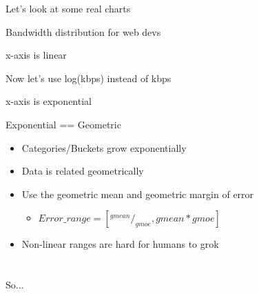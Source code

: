 \documentclass{beamer}
\begin{document}
\begin{frame}{}
\begin{block}{}
\begin{center}
Let's look at some real charts
\end{center}
\end{block}
\end{frame}

\begin{frame}{Bandwidth distribution for web devs}
  \parbox[c][0.55\paperheight]{\paperwidth}{ }
  \begin{center} x-axis is linear \end{center}
\end{frame}

\begin{frame}{Now let's use log(kbps) instead of kbps}
  \parbox[c][0.55\paperheight]{\paperwidth}{ }
  \begin{center} x-axis is exponential \end{center}
\end{frame}

\begin{frame}{Exponential == Geometric}
  \begin{itemize}
  \item Categories/Buckets grow exponentially
  \item Data is related geometrically
  \item<2-> Use the geometric mean and geometric margin of error
    \begin{itemize}
    \item \(Error\_range = \left[^{gmean}/_{gmoe}, gmean*gmoe\right]\)
    \end{itemize}
  \item<3-> Non-linear ranges are hard for humans to grok
  \end{itemize}
\end{frame}

\section{}

\begin{frame}{}
  \begin{center} \LARGE{So...} \end{center}
\end{frame}
\end{document}

